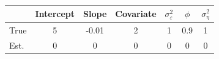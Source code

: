 \begin{tabular}{lcccccc}
\toprule
& Intercept & Slope & Covariate & $\sigma_\varepsilon^2$ & $\phi$ & $\sigma_\eta^2$ \\
\midrule
True & 5 & -0.01 & 2 & 1 & 0.9 & 1 \\
\midrule
Est. & 0 & 0 & 0 & 0 & 0 & 0 \\
\bottomrule
\end{tabular}
